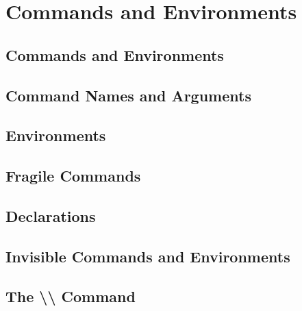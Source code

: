 \section{Commands and Environments}
\subsection{Commands and Environments}


\subsection{Command Names and Arguments}


\subsection{Environments}


\subsection{Fragile Commands}


\subsection{Declarations}


\subsection{Invisible Commands and Environments}


\subsection{The \textbackslash\textbackslash{} Command}